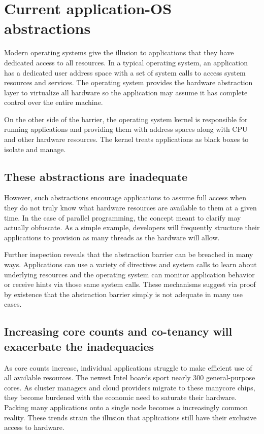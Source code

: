 \section{Current application-OS abstractions}

Modern operating systems give the illusion to applications that they have dedicated access to all resources. In a typical operating system, an application has a dedicated user address space with a set of system calls to access system resources and services. The operating system provides the hardware abstraction layer to virtualize all hardware so the application may assume it has complete control over the entire machine.

On the other side of the barrier, the operating system kernel is responsible for running applications and providing them with address spaces along with CPU and other hardware resources. The kernel treats applications as black boxes to isolate and manage.

\subsection{These abstractions are inadequate}
However, such abstractions encourage applications to assume full access when they do not truly know what hardware resources are available to them at a given time. In the case of parallel programming, the concept meant to clarify may actually obfuscate. As a simple example, developers will frequently structure their applications to provision as many threads as the hardware will allow.

Further inspection reveals that the abstraction barrier can be breached in many ways. Applications can use a variety of directives and system calls to learn about underlying resources and the operating system can monitor application behavior or receive hints via those same system calls. These mechanisms suggest via proof by existence that the abstraction barrier simply is not adequate in many use cases.

\subsection{Increasing core counts and co-tenancy will exacerbate the inadequacies}

As core counts increase, individual applications struggle to make efficient use of all available resources. The newest Intel boards sport nearly 300 general-purpose cores. As cluster managers and cloud providers migrate to these manycore chips, they become burdened with the economic need to saturate their hardware. Packing many applications onto a single node becomes a increasingly common reality. These trends strain the illusion that applications still have their exclusive access to hardware.






